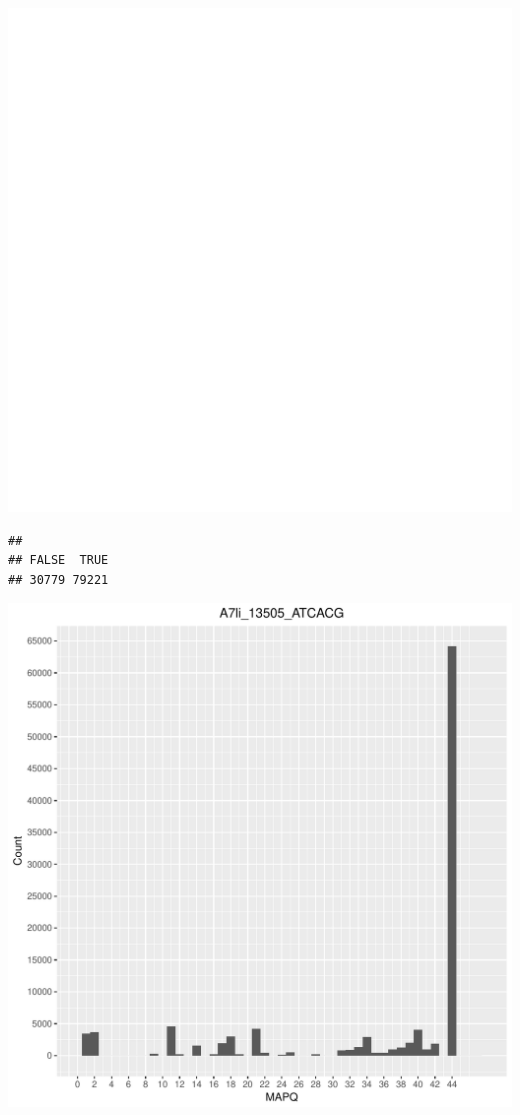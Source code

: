 \documentclass[12pt, a4paper]{article}\usepackage[]{graphicx}\usepackage[]{color}
\makeatletter
\def\maxwidth{ %
  \ifdim\Gin@nat@width>\linewidth
    \linewidth
  \else
    \Gin@nat@width
  \fi
}
\newenvironment{kframe}{%
 \def\at@end@of@kframe{}%
 \ifinner\ifhmode%
  \def\at@end@of@kframe{\end{minipage}}%
  \begin{minipage}{\columnwidth}%
 \fi\fi%
 \def\FrameCommand##1{\hskip\@totalleftmargin \hskip-\fboxsep
 \colorbox{shadecolor}{##1}\hskip-\fboxsep
     \hskip-\linewidth \hskip-\@totalleftmargin \hskip\columnwidth}%
 \MakeFramed {\advance\hsize-\width
   \@totalleftmargin\z@ \linewidth\hsize
   \@setminipage}}%
 {\par\unskip\endMakeFramed%
 \at@end@of@kframe}
\newenvironment{knitrout}{}{} %
\makeatother
\begin{document}
\begin{knitrout}
\includegraphics[width=\maxwidth]{figure/unnamed-chunk-3-12} 
\begin{kframe}\begin{verbatim}
## 
## FALSE  TRUE 
## 30779 79221
\end{verbatim}
\end{kframe}
\includegraphics[width=\maxwidth]{figure/unnamed-chunk-3-13} 


\end{knitrout}
\end{document}
